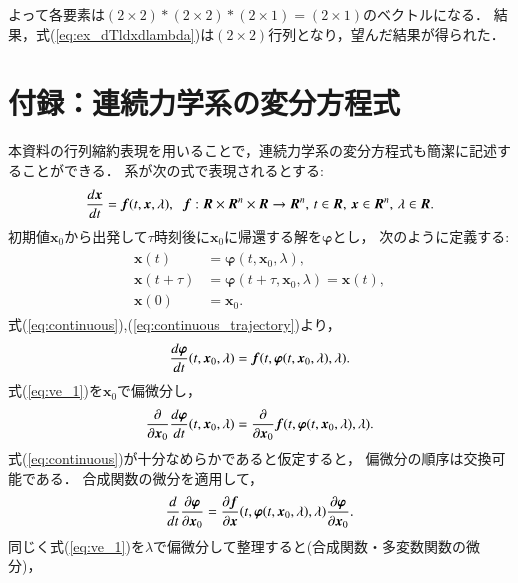 \documentclass[a4paper,dvipdfmx]{jsarticle}
\newcommand{\diff}[3]{
 \ifnum #1<1
 \text{Args[0] should be more than 1} \else{
 \ifnum #1=1 \displaystyle \frac{d#2}{d#3}\else
 \displaystyle \frac{d^{#1} #2}{d#3^{#1}}\fi
 }\fi
}
\newcommand{\pdiff}[3]{
 \ifnum #1<1
 \text{Args[0] should be more than 1} \else{
 \ifnum #1=1 \displaystyle \frac{\partial #2}{\partial #3}\else
 \displaystyle \frac{\partial^{#1} #2}{\partial #3^{#1}}\fi
 }\fi
}
\begin{document}
よって各要素は$(2\times2)*(2\times2)*(2\times1)=(2\times1)$のベクトルになる．
結果，式(\ref{eq:ex_dTldxdlambda})は$(2\times2)$行列となり，望んだ結果が得られた．

\section{付録：連続力学系の変分方程式}
本資料の行列縮約表現を用いることで，連続力学系の変分方程式も簡潔に記述することができる．
系が次の式で表現されるとする:
\begin{align}
    \diff{1}{\bm{x}}{t} = \bm{f}(t, \bm{x}, \lambda),\hspace{0.2cm}
    \bm{f}:\bm{R}\times\bm{R}^n\times\bm{R}\rightarrow\bm{R}^n,\,
    t\in\bm{R},\, \bm{x}\in\bm{R}^n,\, \lambda\in\bm{R}.
    \label{eq:continuous}
\end{align}
初期値$\bm{x}_0$から出発して$\tau$時刻後に$\bm{x}_0$に帰還する解を$\bm{\varphi}$とし，
次のように定義する:
\begin{align}
    \begin{split}
        \bm{x}(t) &= \bm{\varphi}(t, \bm{x}_0, \lambda),\\
        \bm{x}(t+\tau) &= \bm{\varphi}(t+\tau, \bm{x}_0, \lambda) = \bm{x}(t),\\
        \bm{x}(0) &= \bm{x}_0.
    \end{split}
    \label{eq:continuous_trajectory}
\end{align}
式(\ref{eq:continuous}),(\ref{eq:continuous_trajectory})より，
\begin{align}
    \diff{1}{\bm{\varphi}}{t}(t, \bm{x}_0, \lambda) =
    \bm{f}(t, \bm{\varphi}(t, \bm{x}_0, \lambda), \lambda).
    \label{eq:ve_1}
\end{align}
式(\ref{eq:ve_1})を$\bm{x}_0$で偏微分し，
\begin{align}
    \pdiff{1}{}{\bm{x}_0} \diff{1}{\bm{\varphi}}{t}(t, \bm{x}_0, \lambda) =
    \pdiff{1}{}{\bm{x}_0} \bm{f}(t, \bm{\varphi}(t, \bm{x}_0, \lambda), \lambda).
\end{align}    
式(\ref{eq:continuous})が十分なめらかであると仮定すると，
偏微分の順序は交換可能である．
合成関数の微分を適用して，
\begin{align}
    \diff{1}{}{t}\pdiff{1}{\bm{\varphi}}{\bm{x}_0} =
    \pdiff{1}{\bm{f}}{\bm{x}}(t, \bm{\varphi}(t, \bm{x}_0, \lambda), \lambda)
    \pdiff{1}{\bm{\varphi}}{\bm{x}_0}.
    \label{eq:ve_init1}
\end{align}
同じく式(\ref{eq:ve_1})を$\lambda$で偏微分して整理すると(合成関数・多変数関数の微分)，
\end{document}
